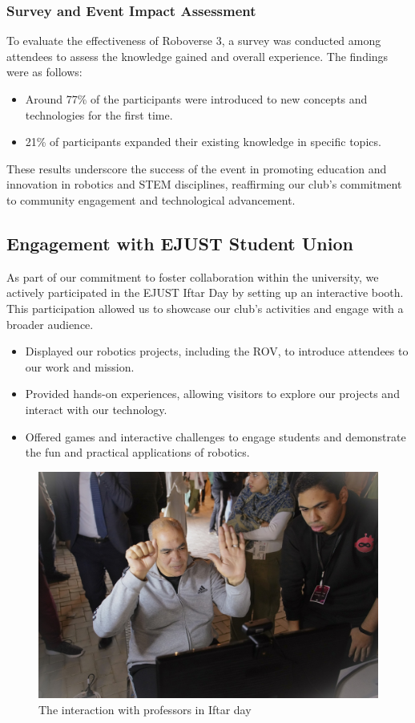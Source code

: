 \documentclass[a4paper,12pt]{article}
\begin{document}
\subsubsection{Survey and Event Impact Assessment}
To evaluate the effectiveness of Roboverse 3, a survey was conducted among attendees to assess the knowledge gained and overall experience. The findings were as follows:
\begin{itemize}
    \item Around 77\% of the participants were introduced to new concepts and technologies for the first time.
    \item 21\% of participants expanded their existing knowledge in specific topics.
\end{itemize}
These results underscore the success of the event in promoting education and innovation in robotics and STEM disciplines, reaffirming our club’s commitment to community engagement and technological advancement.

\subsection{Engagement with EJUST Student Union}
As part of our commitment to foster collaboration within the university, we actively participated in the EJUST Iftar Day by setting up an interactive booth. This participation allowed us to showcase our club's activities and engage with a broader audience.


\begin{itemize}
    \item Displayed our robotics projects, including the ROV, to introduce attendees to our work and mission.
    \item Provided hands-on experiences, allowing visitors to explore our projects and interact with our technology.
    \item Offered games and interactive challenges to engage students and demonstrate the fun and practical applications of robotics.
\end{itemize}
\begin{figure}[h]
            \centering
            \includegraphics[width=0.75\linewidth]{Ejust Iftar.jpg}
            \caption{The interaction with professors in Iftar day  }
            \label{fig:enter-label}
                \end{figure}
\end{document}
